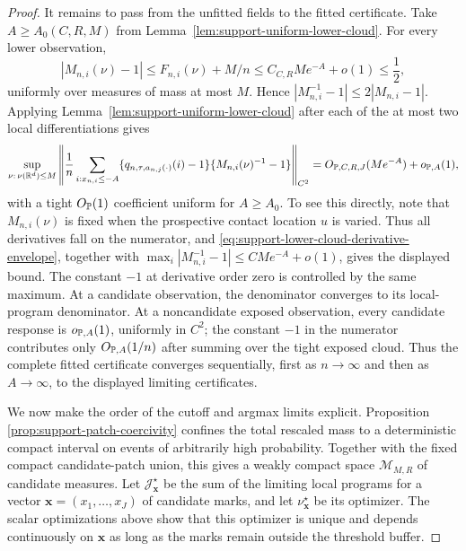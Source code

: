 \begin{proof}
It remains to pass from the unfitted fields to the fitted certificate.  Take
\(A\ge A_0(C,R,M)\) from
Lemma~\ref{lem:support-uniform-lower-cloud}.  For every lower observation,
\[
 |M_{n,i}(\nu)-1|
 \le F_{n,i}(\nu)+M/n
 \le C_{C,R}Me^{-A}+o(1)\le\frac12,
\]
uniformly over measures of mass at most \(M\).  Hence
\(|M_{n,i}^{-1}-1|\le2|M_{n,i}-1|\).  Applying
Lemma~\ref{lem:support-uniform-lower-cloud} after each of
the at most two local differentiations gives
\begin{equation}
\label{eq:support-weighted-lower-c2}
 \sup_{\nu:\,\nu(\mathbb R^d)\le M}
 \left\|
  \frac1n\sum_{i:x_{n,i}\le-A}
 \{q_{n,\tau,a_{n,j}(\cdot)}(i)-1\}
 \{M_{n,i}(\nu)^{-1}-1\}
 \right\|_{C^2}
 =O_{\mathbb P,C,R,J}(Me^{-A})+o_{\mathbb P,A}(1),
\end{equation}
with a tight \(O_{\mathbb P}(1)\) coefficient uniform for \(A\ge A_0\).
To see this directly, note that \(M_{n,i}(\nu)\) is fixed when the prospective
contact location \(u\) is varied.  Thus all derivatives fall on the numerator,
and \eqref{eq:support-lower-cloud-derivative-envelope}, together with
\(\max_i|M_{n,i}^{-1}-1|\le CMe^{-A}+o(1)\), gives the displayed bound.  The
constant \(-1\) at derivative order zero is controlled by the same maximum.
At a candidate observation, the denominator converges to its local-program
denominator.  At a noncandidate exposed observation, every candidate response
is \(o_{\mathbb P,A}(1)\), uniformly in \(C^2\); the constant \(-1\) in the
numerator contributes only \(O_{\mathbb P,A}(1/n)\) after summing over the tight
exposed cloud.  Thus the complete fitted certificate
converges sequentially, first as \(n\to\infty\) and then as \(A\to\infty\),
to the displayed limiting certificates.

We now make the order of the cutoff and argmax limits explicit. Proposition
\ref{prop:support-patch-coercivity} confines the total rescaled mass to a
deterministic compact interval on events of arbitrarily high probability.
Together with the fixed compact candidate-patch union, this gives a weakly
compact space \(\mathcal M_{M,R}\) of candidate measures. Let
\(\mathcal J^\star_{\boldsymbol x}\) be the sum of the limiting local programs
for a vector \(\boldsymbol x=(x_1,\ldots,x_J)\) of candidate marks, and let
\(\nu^\star_{\boldsymbol x}\) be its optimizer. The scalar optimizations above
show that this optimizer is unique and depends continuously on
\(\boldsymbol x\) as long as the marks remain outside the threshold buffer.


\end{proof}
